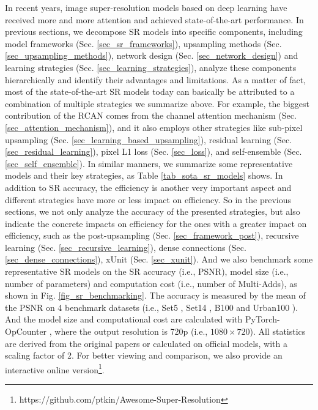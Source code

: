 {\label{sec_sota_sr_models}
In recent years, image super-resolution models based on deep learning have received more and more attention and achieved state-of-the-art performance.
In previous sections, we decompose SR models into specific components, including model frameworks (Sec. \ref{sec_sr_frameworks}), upsampling methods (Sec. \ref{sec_upsampling_methods}), network design (Sec. \ref{sec_network_design}) and learning strategies (Sec. \ref{sec_learning_strategies}), analyze these components hierarchically and identify their advantages and limitations.
As a matter of fact, most of the state-of-the-art SR models today can basically be attributed to a combination of multiple strategies we summarize above.
For example, the biggest contribution of the RCAN  comes from the channel attention mechanism (Sec. \ref{sec_attention_mechanism}), and it also employs other strategies like sub-pixel upsampling (Sec. \ref{sec_learning_based_upsampling}), residual learning (Sec. \ref{sec_residual_learning}), pixel L1 loss (Sec. \ref{sec_loss}), and self-ensemble (Sec. \ref{sec_self_ensemble}).
In similar manners, we summarize some representative models and their key strategies, as Table \ref{tab_sota_sr_models} shows.
In addition to SR accuracy, the efficiency is another very important aspect and different strategies have more or less impact on efficiency.
So in the previous sections, we not only analyze the accuracy of the presented strategies, but also indicate the concrete impacts on efficiency for the ones with a greater impact on efficiency, such as the post-upsampling (Sec. \ref{sec_framework_post}), recursive learning (Sec. \ref{sec_recursive_learning}), dense connections (Sec. \ref{sec_dense_connections}), xUnit (Sec. \ref{sec_xunit}).
And we also benchmark some representative SR models on the SR accuracy (i.e., PSNR), model size (i.e., number of parameters) and computation cost (i.e., number of Multi-Adds), as shown in Fig. \ref{fig_sr_benchmarking}.
The accuracy is measured by the mean of the PSNR on 4 benchmark datasets (i.e., Set5 , Set14 , B100  and Urban100 ).
And the model size and computational cost are calculated with PyTorch-OpCounter , where the output resolution is 720p (i.e., $1080 \times 720$).
All statistics are derived from the original papers or calculated on official models, with a scaling factor of 2.
For better viewing and comparison, we also provide an interactive online version\footnote{https://github.com/ptkin/Awesome-Super-Resolution}.

}
